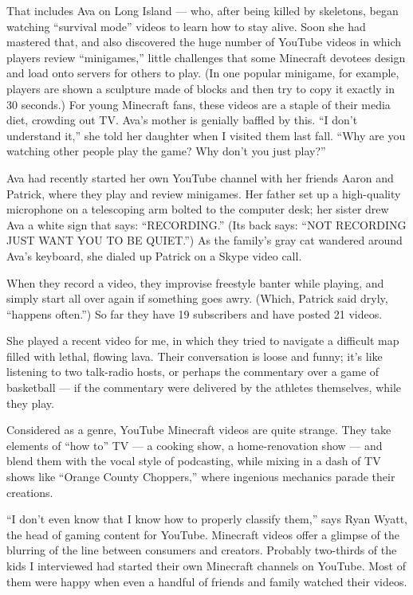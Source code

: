 That includes Ava on Long Island --- who, after being killed by
skeletons, began watching ``survival mode'' videos to learn how to stay
alive. Soon she had mastered that, and also discovered the huge number
of YouTube videos in which players review ``minigames,'' little
challenges that some Minecraft devotees design and load onto servers for
others to play. (In one popular minigame, for example, players are shown
a sculpture made of blocks and then try to copy it exactly in 30
seconds.) For young Minecraft fans, these videos are a staple of their
media diet, crowding out TV. Ava's mother is genially baffled by this.
``I don't understand it,'' she told her daughter when I visited them
last fall. ``Why are you watching other people play the game? Why don't
you just play?''

Ava had recently started her own YouTube channel with her friends Aaron
and Patrick, where they play and review minigames. Her father set up a
high-­quality microphone on a telescoping arm bolted to the computer
desk; her sister drew Ava a white sign that says: ``RECORDING.'' (Its
back says: ``NOT RECORDING JUST WANT YOU TO BE QUIET.'') As the family's
gray cat wandered around Ava's keyboard, she dialed up Patrick on a
Skype video call.

When they record a video, they improvise freestyle banter while playing,
and simply start all over again if something goes awry. (Which, Patrick
said dryly, ``happens often.'') So far they have 19 subscribers and have
posted 21 videos.

She played a recent video for me, in which they tried to navigate a
difficult map filled with lethal, flowing lava. Their conversation is
loose and funny; it's like listening to two talk-­radio hosts, or
perhaps the commentary over a game of basketball --- if the commentary
were delivered by the athletes themselves, while they play.

Considered as a genre, YouTube Minecraft videos are quite strange. They
take elements of ``how to'' TV --- a cooking show, a home-­renovation
show --- and blend them with the vocal style of podcasting, while mixing
in a dash of TV shows like ``Orange County Choppers,'' where ingenious
mechanics parade their creations.

``I don't even know that I know how to properly classify them,'' says
Ryan Wyatt, the head of gaming content for YouTube. Minecraft videos
offer a glimpse of the blurring of the line between consumers and
creators. Probably two-thirds of the kids I interviewed had started
their own Minecraft channels on YouTube. Most of them were happy when
even a handful of friends and family watched their videos.

